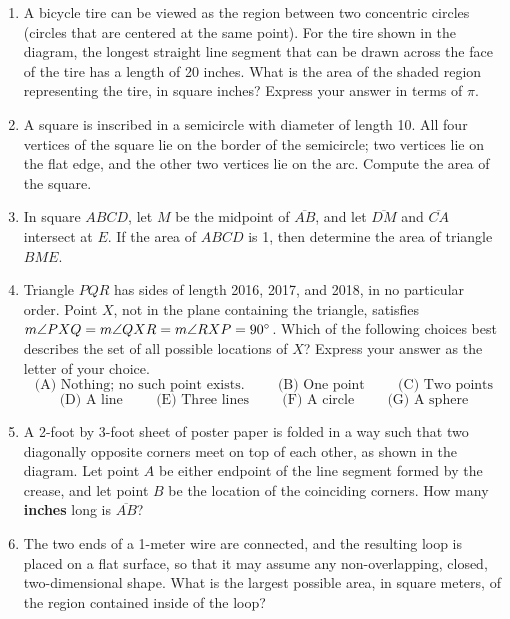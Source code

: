 \documentclass[11pt]{article}
\begin{document}
\begin{enumerate}[1.]
			\item A bicycle tire can be viewed as the region between two concentric circles (circles that are centered at the same point). For the tire shown in the diagram, the longest straight line segment that can be drawn across the face of the tire has a length of 20 inches. What is the area of the shaded region representing the tire, in square inches? Express your answer in terms of $\pi$.
			
			\item A square is inscribed in a semicircle with diameter of length 10. All four vertices of the square lie on the border of the semicircle; two vertices lie on the flat edge, and the other two vertices lie on the arc. Compute the area of the square.
			
			\item In square $ABCD$, let $M$ be the midpoint of $\overline{AB}$, and let $\overline{DM}$ and $\overline{CA}$ intersect at $E$. If the area of $ABCD$ is 1, then determine the area of triangle $BME$.
			
			\item Triangle $PQR$ has sides of length 2016, 2017, and 2018, in no particular order. Point $X$, not in the plane containing the triangle, satisfies $m\angle PXQ = m\angle QXR = m\angle RXP = 90\degree$. Which of the following choices best describes the set of all possible locations of $X$? Express your answer as the letter of your choice.
			$$\text{(A) Nothing; no such point exists.}   \hspace{1cm}\text{(B) One point}\hspace{1cm}\text{(C) Two points}$$ 
			$$\text{(D) A line}\hspace{1cm}\text{(E) Three lines}\hspace{1cm}\text{(F) A circle}\hspace{1cm}\text{(G) A sphere}$$
			
			\item A 2-foot by 3-foot sheet of poster paper is folded in a way such that two diagonally opposite corners meet on top of each other, as shown in the diagram. Let point $A$ be either endpoint of the line segment formed by the crease, and let point $B$ be the location of the coinciding corners. How many \textbf{inches} long is $\overline{AB}$?
			
			\item The two ends of a 1-meter wire are connected, and the resulting loop is placed on a flat surface, so that it may assume any non-overlapping, closed, two-dimensional shape. What is the largest possible area, in square meters, of the region contained inside of the loop?
			

\end{enumerate}
\end{document}
